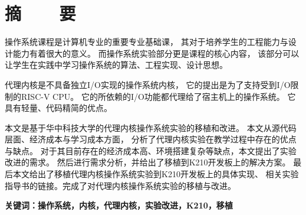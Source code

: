 %
%
%
%
%

\vspace*{-11mm}

\begin{center}
  \heiti{}\textbf{\thesisTitle}
\end{center}

\vspace*{2mm}

{\let\clearpage\relax \chapter*{\textmd{摘~~~~要}}}
\setcounter{page}{1}

\vspace*{1mm}

\setlength{\parskip}{0em}

操作系统课程是计算机专业的重要专业基础课，
其对于培养学生的工程能力与设计能力有着很大的意义。
而操作系统实验部分更是课程的核心内容，
该部分可以让学生在实践中学习操作系统的算法、工程实现、设计思想。

代理内核是不具备独立I/O实现的操作系统内核，
它的提出是为了支持受到I/O限制的RISC-V CPU。
它的所依赖的I/O功能都代理给了宿主机上的操作系统。
它具有轻量、代码精简的优点。

本文是基于华中科技大学的代理内核操作系统实验的移植和改进。
本文从源代码层面、经济成本与学习成本方面，
分析了代理内核实验在教学过程中存在的优点与缺点。
对于其目前存在的经济成本高、环境搭建复杂等缺点，本文提出了实验改进的需求。
然后进行需求分析，并给出了移植到K210开发板上的解决方案。
最后本文给出了移植代理内核操作系统实验到K210开发板上的具体实现、
相关实验指导书的链接。完成了对代理内核操作系统实验的移植与改进。

\vspace{4ex}\noindent\textbf{\heiti 关键词：操作系统，内核，代理内核，实验改进，K210，移植}
\newpage

